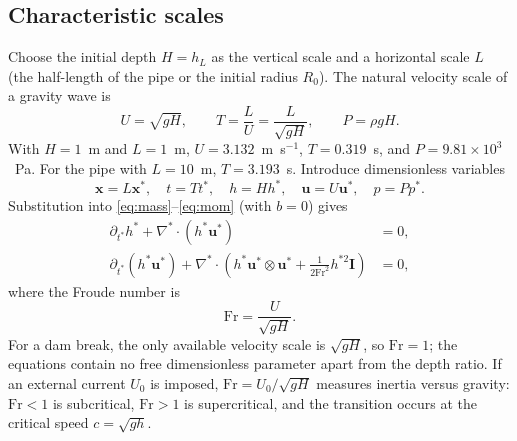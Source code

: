 ﻿\documentclass[11pt,a4paper]{article}
\newcommand{\Froude}{\mathrm{Fr}}
\newcommand{\bu}{\mathbf{u}}
\newcommand{\bx}{\mathbf{x}}
\newcommand{\bI}{\mathbf{I}}
\begin{document}
\subsection{Characteristic scales}
Choose the initial depth $H=h_L$ as the vertical scale and a horizontal scale
$L$ (the half-length of the pipe or the initial radius $R_0$).  The natural
velocity scale of a gravity wave is
\begin{equation}
  U=\sqrt{gH},\qquad T=\frac{L}{U}=\frac{L}{\sqrt{gH}},\qquad
  P=\rho gH .
  \label{eq:scales}
\end{equation}
With $H=1$~m and $L=1$~m, $U=3.132$~m~s$^{-1}$, $T=0.319$~s, and
$P=9.81\times10^3$~Pa.  For the pipe with $L=10$~m, $T=3.193$~s.
Introduce dimensionless variables
\begin{equation}
  \bx=L\bx^*,\quad t=Tt^*,\quad h=Hh^*,\quad
  \bu=U\bu^*,\quad p=Pp^* .
  \label{eq:nondimvars}
\end{equation}
Substitution into \eqref{eq:mass}--\eqref{eq:mom} (with $b=0$) gives
\begin{align}
  \partial_{t^*}h^* + \nabla^*\cdot(h^*\bu^*) &= 0, \label{eq:nondimmass}\\
  \partial_{t^*}(h^*\bu^*) + \nabla^*\cdot\left(h^*\bu^*\otimes\bu^*
      + \frac{1}{2\Froude^2}h^{*2}\bI\right) &= 0,
  \label{eq:nondimmom}
\end{align}
where the Froude number is
\begin{equation}
  \Froude=\frac{U}{\sqrt{gH}} .
  \label{eq:fr}
\end{equation}
For a dam break, the only available velocity scale is $\sqrt{gH}$, so
$\Froude=1$; the equations contain no free dimensionless parameter apart from
the depth ratio.  If an external current $U_0$ is imposed, $\Froude=U_0/\sqrt{gH}$
measures inertia versus gravity: $\Froude<1$ is subcritical, $\Froude>1$ is
supercritical, and the transition occurs at the critical speed $c=\sqrt{gh}$.
\end{document}
